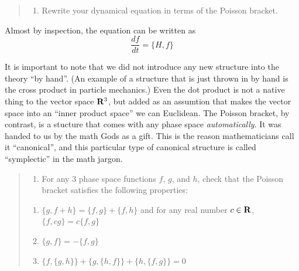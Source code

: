 \documentclass[
  letterpaper,
  DIV=11,
  numbers=noendperiod]{scrartcl}
\providecommand{\tightlist}{%
  \setlength{\itemsep}{0pt}\setlength{\parskip}{0pt}}
\begin{document}
\begin{quote}
\begin{enumerate}
\def\labelenumi{\arabic{enumi}.}
\setcounter{enumi}{7}
\tightlist
\item
  Rewrite your dynamical equation in terms of the Poisson bracket.
\end{enumerate}
\end{quote}

Almost by inspection, the equation can be written as \[
\frac {df}{dt} = \{H,f\}
\]

It is important to note that we did not introduce any new structure into
the theory ``by hand''. (An example of a structure that is just thrown
in by hand is the cross product in particle mechanics.) Even the dot
product is not a native thing to the vector space \({\bf R}^3\), but
added as an assumtion that makes the vector space into an ``inner
product space'' we can Euclidean. The Poisson bracket, by contrast, is a
stucture that comes with any phase space \emph{automatically}. It was
handed to us by the math Gods as a gift. This is the reason
mathematicians call it ``canonical'', and this particular type of
canonical structure is called ``symplectic'' in the math jargon.

\begin{quote}
\begin{enumerate}
\def\labelenumi{\arabic{enumi}.}
\setcounter{enumi}{8}
\tightlist
\item
  For any 3 phase space functions \(f\), \(g\), and \(h\), check that
  the Poisson bracket satisfies the following properties:\\
\end{enumerate}

\begin{enumerate}
\def\labelenumi{\roman{enumi}.}
\tightlist
\item
  \(\{g, f+h\} = \{f, g\}+ \{f, h\}\) and for any real number
  \(c\in {\bf R}\), \(\{f, cg\}=c\{f, g\}\)\\
\item
  \(\{g, f\} = -\{f, g\}\)\\
\item
  \(\{f, \{g, h\}\} + \{g,\{h, f\}\} + \{h, \{f, g\}\} = 0\)
\end{enumerate}
\end{quote}
\end{document}
